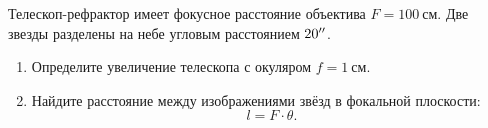 Телескоп-рефрактор имеет фокусное расстояние объектива $F = \qty{100}{см}$.
Две звезды разделены на небе угловым расстоянием $20^{\prime\prime}$.

\begin{enumerate}[label=\alph*)]
  \item Определите увеличение телескопа с окуляром $f = \qty{1}{см}$.
  \item Найдите расстояние между изображениями звёзд в фокальной плоскости:
        \[ l = F \cdot \theta. \]
\end{enumerate}

